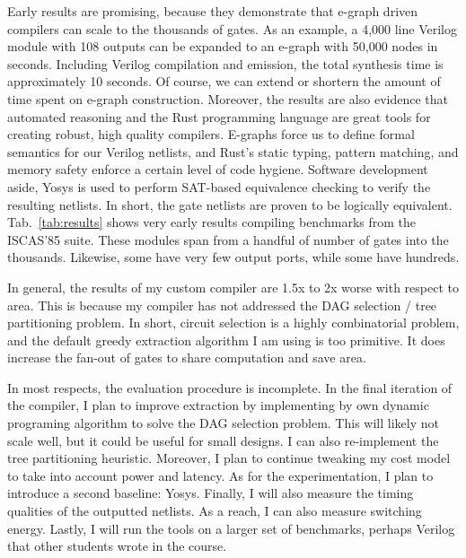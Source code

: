 \documentclass[10pt,letterpaper]{article}
\begin{document}
Early results are promising, because they demonstrate that e-graph driven
compilers can scale to the thousands of gates. As an example, a 4,000 line
Verilog module with 108 outputs can be expanded to an e-graph with 50,000 nodes
in seconds. Including Verilog compilation and emission, the total synthesis
time is approximately 10 seconds. Of course, we can extend or shortern the
amount of time spent on e-graph construction. Moreover, the results are also
evidence that automated reasoning and the Rust programming language are great
tools for creating robust, high quality compilers. E-graphs force us to define
formal semantics for our Verilog netlists, and Rust's static typing, pattern
matching, and memory safety enforce a certain level of code hygiene. Software
development aside, Yosys is used to perform SAT-based equivalence checking to
verify the resulting netlists. In short, the gate netlists are proven to be
logically equivalent. Tab.~\ref{tab:results} shows very early results compiling
benchmarks from the ISCAS'85 suite. These modules span from a handful of number
of gates into the thousands. Likewise, some have very few output ports, while
some have hundreds.

In general, the results of my custom compiler are 1.5x to 2x worse with respect
to area. This is because my compiler has not addressed the DAG selection / tree
partitioning problem. In short, circuit selection is a highly combinatorial
problem, and the default greedy extraction algorithm I am using is too
primitive. It does increase the fan-out of gates to share computation and save
area.

In most respects, the evaluation procedure is incomplete. In the final
iteration of the compiler, I plan to improve extraction by implementing by own
dynamic programing algorithm to solve the DAG selection problem. This will
likely not scale well, but it could be useful for small designs. I can also
re-implement the tree partitioning heuristic. Moreover, I plan to continue
tweaking my cost model to take into account power and latency. As for the
experimentation, I plan to introduce a second baseline: Yosys. Finally, I will
also measure the timing qualities of the outputted netlists. As a reach, I can
also measure switching energy. Lastly, I will run the tools on a larger set of
benchmarks, perhaps Verilog that other students wrote in the course.
\end{document}
